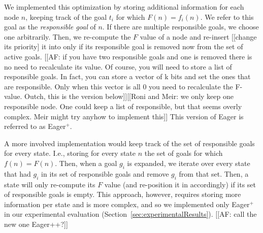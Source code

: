 We implemented this optimization by storing additional information for each node $n$, keeping track of the goal $t_i$ for which $F(n)=f_i(n)$.
We refer to this goal as the \emph{responsible goal} of $n$.
If there are multiple responsible goals, we choose one arbitrarily.
Then, we re-compute the $F$ value of a node and re-insert [[change its priority] it into \open only if its responsible goal is removed now from the set of active goals. [[AF: if you have two responsible goals and one is removed there is no need to recalculate its value. Of course, you will need to store a list of responsible goals. In fact, you can store a vector of k bits and set the ones that are responsible. Only when this vector is all 0 you need to recalculate the F-value. Outch, this is the version below]][[Roni and Meir: we only keep one responsible node. One could keep a list of responsible, but that seems overly complex. Meir might try anyhow to implement this]]
This version of Eager \kastar is referred to as Eager$^+$.

A more involved implementation would keep track of the set of responsible goals for every state.
I.e., storing for every state $n$ the set of goals for which $f(n)=F(n)$.
Then, when a goal $g_i$ is expanded, we iterate over every state that had $g_i$ in its set of responsible goals and remove $g_i$ from that set.
Then, a state will only re-compute its $F$ value (and re-position it in \open accordingly) if its set of responsible goals is empty.
This approach, however, requires storing more information per state and is more complex, and so we implemented only Eager$^+$ in our experimental evaluation (Section~\ref{sec:experimentalResults}). [[AF: call the new one Eager++?]] %


